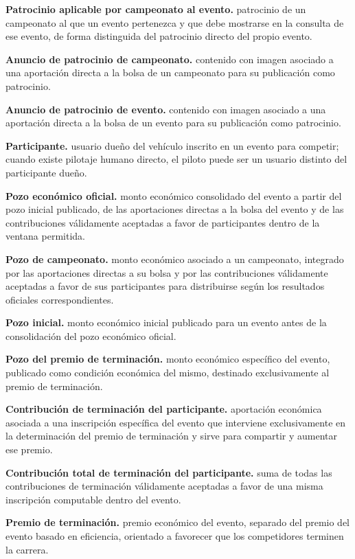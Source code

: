 \documentclass[10pt,letterpaper]{article}
\begin{document}
\noindent\textbf{Patrocinio aplicable por campeonato al evento.} patrocinio de un campeonato al que un evento pertenezca y que debe mostrarse en la consulta de ese evento, de forma distinguida del patrocinio directo del propio evento.\par
\noindent\textbf{Anuncio de patrocinio de campeonato.} contenido con imagen asociado a una aportación directa a la bolsa de un campeonato para su publicación como patrocinio.\par
\noindent\textbf{Anuncio de patrocinio de evento.} contenido con imagen asociado a una aportación directa a la bolsa de un evento para su publicación como patrocinio.\par
\noindent\textbf{Participante.} usuario dueño del vehículo inscrito en un evento para competir; cuando existe pilotaje humano directo, el piloto puede ser un usuario distinto del participante dueño.\par
\noindent\textbf{Pozo económico oficial.} monto económico consolidado del evento a partir del pozo inicial publicado, de las aportaciones directas a la bolsa del evento y de las contribuciones válidamente aceptadas a favor de participantes dentro de la ventana permitida.\par
\noindent\textbf{Pozo de campeonato.} monto económico asociado a un campeonato, integrado por las aportaciones directas a su bolsa y por las contribuciones válidamente aceptadas a favor de sus participantes para distribuirse según los resultados oficiales correspondientes.\par
\noindent\textbf{Pozo inicial.} monto económico inicial publicado para un evento antes de la consolidación del pozo económico oficial.\par
\noindent\textbf{Pozo del premio de terminación.} monto económico específico del evento, publicado como condición económica del mismo, destinado exclusivamente al premio de terminación.\par
\noindent\textbf{Contribución de terminación del participante.} aportación económica asociada a una inscripción específica del evento que interviene exclusivamente en la determinación del premio de terminación y sirve para compartir y aumentar ese premio.\par
\noindent\textbf{Contribución total de terminación del participante.} suma de todas las contribuciones de terminación válidamente aceptadas a favor de una misma inscripción computable dentro del evento.\par
\noindent\textbf{Premio de terminación.} premio económico del evento, separado del premio del evento basado en eficiencia, orientado a favorecer que los competidores terminen la carrera.\par
\end{document}

